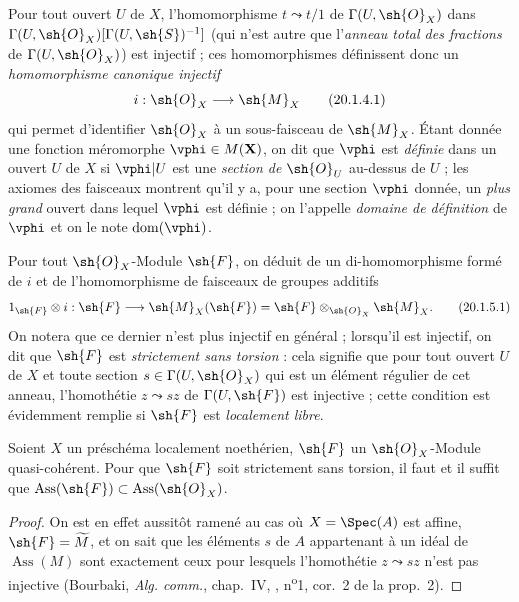 \begin{env}[20.1.4]
Pour tout ouvert $U$ de $X$, l'homomorphisme $t\leadsto t/1$ de $\Gamma(U,\sh{O}_X)$ dans $\Gamma(U,\sh{O}_X)[\Gamma(U,\sh{S})^{-1}]$ (qui n'est autre que l'\emph{anneau total des fractions} de
$\Gamma(U,\sh{O}_X)$) est injectif ; ces homomorphismes définissent donc un \emph{homomorphisme canonique injectif}
\[
\label{IV.20.1.4.1}
  i:\sh{O}_X\to\sh{M}_X
  \tag{20.1.4.1}
\]
qui permet d'identifier $\sh{O}_X$ à un sous-faisceau de $\sh{M}_X$.
Étant donnée une fonction méromorphe $\vphi\in M(\mathbf{X})$, on dit que $\vphi$ est \emph{définie} dans un ouvert $U$ de $X$ si $\vphi|U$ est une \emph{section de $\sh{O}_U$} au-dessus de $U$ ; les axiomes des faisceaux montrent qu'il y a, pour une section $\vphi$ donnée, un \emph{plus grand} ouvert dans lequel $\vphi$ est définie ; on l'appelle \emph{domaine de définition} de $\vphi$ et on le note $\operatorname{dom}(\vphi)$.
\end{env}

\begin{env}[20.1.5]
Pour tout $\sh{O}_X$-Module $\sh{F}$, on déduit de  un di-homomorphisme formé de $i$ et de l'homomorphisme de faisceaux de groupes additifs
\[
\label{IV.20.1.5.1}
  1_{\sh{F}}\otimes i:\sh{F}\to\sh{M}_X(\sh{F})=\sh{F}\otimes_{\sh{O}_X}\sh{M}_X.
  \tag{20.1.5.1}
\]
On notera que ce dernier n'est plus injectif en général ; lorsqu'il est injectif, on dit que $\sh{F}$ est \emph{strictement sans torsion} : cela signifie que pour tout ouvert $U$ de $X$ et toute section $s\in\Gamma(U,\sh{O}_X)$ qui est un élément régulier de cet anneau, l'homothétie $z\leadsto sz$ de $\Gamma(U,\sh{F})$ est injective ; cette condition est évidemment remplie si $\sh{F}$ est \emph{localement libre}.
\end{env}

\begin{proposition}[20.1.6]
\label{IV.20.1.6}
Soient $X$ un préschéma localement noethérien, $\sh{F}$ un $\sh{O}_X$-Module quasi-cohérent.
Pour que $\sh{F}$ soit strictement sans torsion, il faut et il suffit que $\operatorname{Ass}(\sh{F})\subset\operatorname{Ass}(\sh{O}_X)$.
\end{proposition}

\begin{proof}
On est en effet aussitôt ramené au cas où $X=\Spec(A)$ est affine, $\sh{F}=\widetilde M$, et on sait que les éléments $s$ de $A$ appartenant à un idéal de $\operatorname{Ass}(M)$ sont exactement ceux pour lesquels l'homothétie $z\leadsto sz$ n'est pas injective (Bourbaki, \emph{Alg. comm.}, chap.~IV, , n\textsuperscript{o}1, cor.~2 de la prop.~2).
\end{proof}

